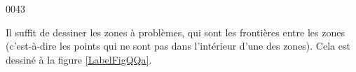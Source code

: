 
\begin{corrige}{0043}

Il suffit de dessiner les \og zones à problèmes\fg, qui sont les frontières entre les zones (c'est-à-dire les points qui ne sont pas dans l'intérieur d'une des zones). 
Cela est dessiné à la figure \ref{LabelFigQQa}.
\newcommand{\CaptionFigQQa}{Les zones à problèmes pour l'exercice \ref{exo0043}.}


\end{corrige}
